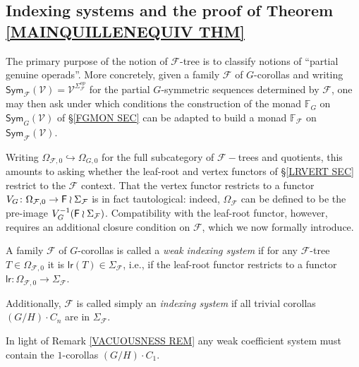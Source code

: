 \documentclass[a4paper,10pt]{article}%
\begin{document}
\subsection{Indexing systems and the proof of Theorem \ref{MAINQUILLENEQUIV THM}}
\label{MAINTHM_PROOF_SECTION}

The primary purpose of the notion of $\mathcal{F}$-tree is to classify notions of ``partial genuine operads''.
More concretely, given a family $\mathcal{F}$ of $G$-corollas and writing 
$\mathsf{Sym}_{\mathcal{F}}(\mathcal{V}) = \mathcal{V}^{\Sigma_{\mathcal{F}}^{op}}$ 
for the partial $G$-symmetric sequences determined by $\mathcal{F}$, one may then ask under which conditions the construction of the monad
$\mathbb{F}_G$ on $\mathsf{Sym}_{G}(\mathcal{V})$
of \S \ref{FGMON SEC}
can be adapted to build a monad
$\mathbb{F}_{\mathcal{F}}$ on 
$\mathsf{Sym}_{\mathcal{F}}(\mathcal{V})$.

Writing $\Omega_{\mathcal{F},0} \hookrightarrow \Omega_{G,0}$ for the full subcategory of $\mathcal{F}-$trees and quotients, 
this amounts to asking whether the leaf-root and vertex functors of \S \ref{LRVERT SEC} restrict to the $\mathcal{F}$ context. That the vertex functor restricts to a functor
$V_G \colon \Omega_{\mathcal{F},0} \to \mathsf{F} \wr \Sigma_{\mathcal{F}}$ is in fact tautological: indeed,
$\Omega_{\mathcal{F}}$ can be defined to be the pre-image 
$V_{G}^{-1}(\mathsf{F} \wr \Sigma_{\mathcal{F}})$.
Compatibility with the leaf-root functor, however, 
requires an additional closure condition on $\mathcal{F}$,
which we now formally introduce.


\begin{definition}\label{INDEXSYS DEF}
	A family $\mathcal{F}$ of $G$-corollas is called a 
	\textit{weak indexing system}
	if for any $\mathcal{F}$-tree $T \in \Omega_{\mathcal{F},0}$ it is 
	$\mathsf{lr}(T) \in \Sigma_{\mathcal{F}}$, i.e., if the leaf-root functor restricts to a functor
	$\mathsf{lr} \colon \Omega_{\mathcal{F},0} \to \Sigma_{\mathcal{F}}$.
	
	Additionally, $\mathcal{F}$ is called simply an \textit{indexing system} if all trivial corollas 
$(G/H)\cdot C_n$ are in $\Sigma_{\mathcal{F}}$.
\end{definition}


\begin{remark}
	In light of Remark \ref{VACUOUSNESS REM} any weak coefficient system must contain the $1$-corollas $(G/H) \cdot C_1$.
\end{remark}
\end{document}
